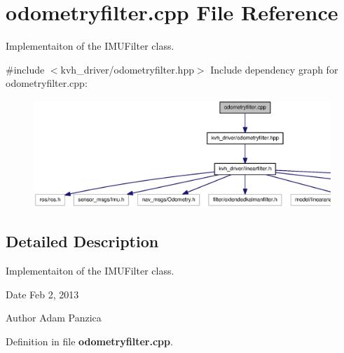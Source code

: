 \section{odometryfilter.\-cpp \-File \-Reference}
\label{odometryfilter_8cpp}


\-Implementaiton of the \-I\-M\-U\-Filter class.  


{\ttfamily \#include $<$kvh\-\_\-driver/odometryfilter.\-hpp$>$}\*
\-Include dependency graph for odometryfilter.\-cpp\-:
\nopagebreak
\begin{figure}[H]
\begin{center}
\leavevmode
\includegraphics[width=350pt]{odometryfilter_8cpp__incl}
\end{center}
\end{figure}


\subsection{\-Detailed \-Description}
\-Implementaiton of the \-I\-M\-U\-Filter class. \begin{DoxyDate}{\-Date}
\-Feb 2, 2013 
\end{DoxyDate}
\begin{DoxyAuthor}{\-Author}
\-Adam \-Panzica 
\end{DoxyAuthor}


\-Definition in file {\bf odometryfilter.\-cpp}.

